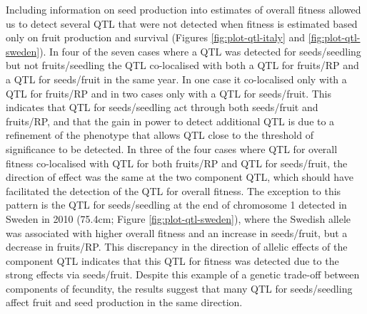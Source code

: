 \documentclass[]{article}
\begin{document}
Including information on seed production into estimates of overall fitness allowed us to detect several QTL that were not detected when fitness is estimated based only on fruit production and survival (Figures \ref{fig:plot-qtl-italy} and \ref{fig:plot-qtl-sweden}). In four of the seven cases where a QTL was detected for seeds/seedling but not fruits/seedling the QTL co-localised with both a QTL for fruits/RP and a QTL for seeds/fruit in the same year. In one case it co-localised only with a QTL for fruits/RP and in two cases only with a QTL for seeds/fruit. This indicates that QTL for seeds/seedling act through both seeds/fruit and fruits/RP, and that the gain in power to detect additional QTL is due to a refinement of the phenotype that allows QTL close to the threshold of significance to be detected. In three of the four cases where QTL for overall fitness co-localised with QTL for both fruits/RP and QTL for seeds/fruit, the direction of effect was the same at the two component QTL, which should have facilitated the detection of the QTL for overall fitness. The exception to this pattern is the QTL for seeds/seedling at the end of chromosome 1 detected in Sweden in 2010 (75.4cm; Figure \ref{fig:plot-qtl-sweden}), where the Swedish allele was associated with higher overall fitness and an increase in seeds/fruit, but a decrease in fruits/RP. This discrepancy in the direction of allelic effects of the component QTL indicates that this QTL for fitness was detected due to the strong effects via seeds/fruit. Despite this example of a genetic trade-off between components of fecundity, the results suggest that many QTL for seeds/seedling affect fruit and seed production in the same direction.
\end{document}
